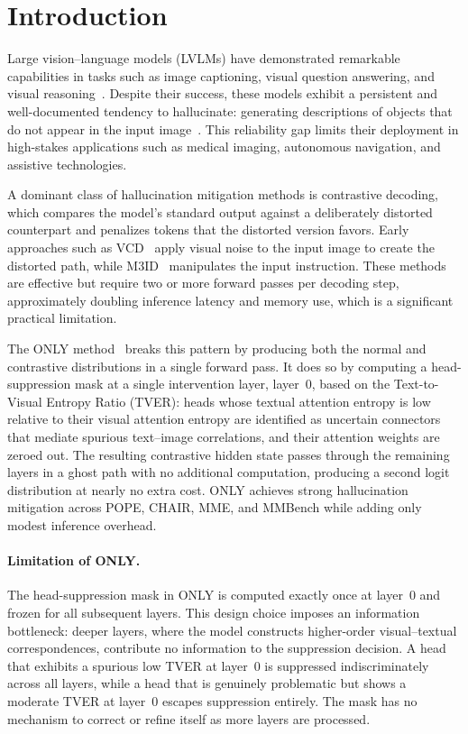 \section{Introduction}
\label{sec:introduction}

Large vision--language models (LVLMs) have demonstrated remarkable capabilities in tasks such as image captioning, visual question answering, and visual reasoning~\cite{alayrac2022flamingo,li2023blip2,liu2024visual}. Despite their success, these models exhibit a persistent and well-documented tendency to hallucinate: generating descriptions of objects that do not appear in the input image~\cite{rohrbach2018object,li2023pope}. This reliability gap limits their deployment in high-stakes applications such as medical imaging, autonomous navigation, and assistive technologies.

A dominant class of hallucination mitigation methods is contrastive decoding, which compares the model's standard output against a deliberately distorted counterpart and penalizes tokens that the distorted version favors. Early approaches such as VCD~\cite{leng2024mitigating} apply visual noise to the input image to create the distorted path, while M3ID~\cite{fayyaz2024m3id} manipulates the input instruction. These methods are effective but require two or more forward passes per decoding step, approximately doubling inference latency and memory use, which is a significant practical limitation.

The ONLY method~\cite{wan2025only} breaks this pattern by producing both the normal and contrastive distributions in a single forward pass. It does so by computing a head-suppression mask at a single intervention layer, layer~0, based on the Text-to-Visual Entropy Ratio (TVER): heads whose textual attention entropy is low relative to their visual attention entropy are identified as uncertain connectors that mediate spurious text--image correlations, and their attention weights are zeroed out. The resulting contrastive hidden state passes through the remaining layers in a ghost path with no additional computation, producing a second logit distribution at nearly no extra cost. ONLY achieves strong hallucination mitigation across POPE, CHAIR, MME, and MMBench while adding only modest inference overhead.

\paragraph{Limitation of ONLY.}
The head-suppression mask in ONLY is computed exactly once at layer~0 and frozen for all subsequent layers. This design choice imposes an information bottleneck: deeper layers, where the model constructs higher-order visual--textual correspondences, contribute no information to the suppression decision. A head that exhibits a spurious low TVER at layer~0 is suppressed indiscriminately across all layers, while a head that is genuinely problematic but shows a moderate TVER at layer~0 escapes suppression entirely. The mask has no mechanism to correct or refine itself as more layers are processed.


